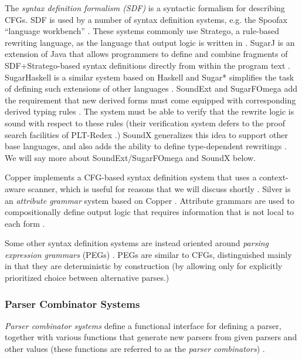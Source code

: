 The \emph{syntax definition formalism  (SDF)}  \cite{journals/sigplan/HeeringHKR89} is a syntactic formalism for describing CFGs. SDF is used by a number of syntax definition systems, e.g. the Spoofax ``language workbench'' \cite{kats2010spoofax}. These systems commonly use Stratego, a rule-based rewriting language, as the language that output logic is written in \cite{Visser-RTA01}. SugarJ is an extension of Java that allows programmers to define and combine fragments of SDF+Stratego-based syntax definitions directly from within the program text \cite{erdweg2011sugarj}. SugarHaskell is a similar system based on Haskell \cite{erdweg2012layout} and Sugar* simplifies the task of defining such extensions of other languages \cite{erdweg2013framework}. SoundExt and SugarFOmega add the requirement that new derived forms must come equipped with corresponding derived typing rules \cite{conf/icfp/LorenzenE13}. The system must be able to verify that the rewrite logic is sound with respect to these rules (their verification system defers to the proof search facilities of PLT-Redex \cite{Felleisen-Findler-Flatt09}.) SoundX generalizes this idea to support other base languages, and also adds the ability to define type-dependent rewritings \cite{conf/popl/LorenzenE16}. We will say more about SoundExt/SugarFOmega and SoundX below.


Copper implements a CFG-based syntax definition system that uses a context-aware scanner, which is useful for reasons that we will discuss shortly \cite{conf/gpce/WykS07}. Silver is an \emph{attribute grammar} system based on Copper \cite{VanWyk:2010:SEA}. Attribute grammars are used to compositionally define output logic that requires information that is not local to each form \cite{knuth1968semantics}.


Some other syntax definition systems are instead oriented  around \emph{parsing expression grammars} (PEGs) \cite{Ford04a}. PEGs are similar to CFGs, distinguished mainly in that they are deterministic by construction (by allowing only for explicitly prioritized choice between alternative parses.)

\subsubsection{Parser Combinator Systems}
\emph{Parser combinator systems} define a functional interface for defining a parser, together with various functions that generate new parsers from given parsers and other values (these functions are referred to as the \emph{parser combinators}) \cite{Hutton1992d}. 

